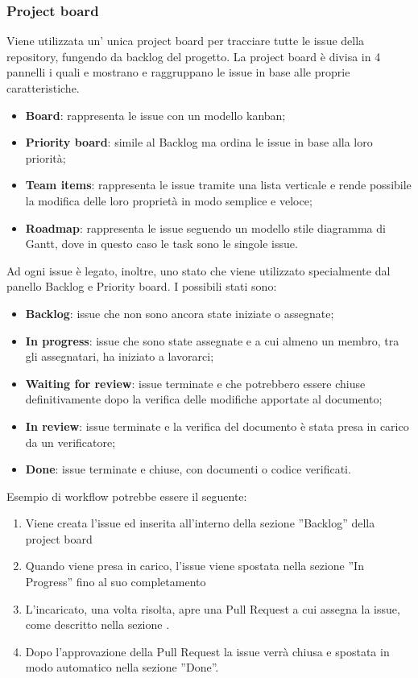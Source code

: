         \subsubsection{Project board}\label{inf:pb}
        Viene utilizzata un' unica project board per tracciare tutte le issue della repository, fungendo da backlog del progetto.
        La project board è divisa in 4 pannelli i quali e mostrano e raggruppano le issue in base alle proprie caratteristiche.
        \begin{itemize}
            \item \textbf{Board}: rappresenta le issue con un modello kanban;
            \item \textbf{Priority board}: simile al Backlog ma ordina le issue in base alla loro priorità;
            \item \textbf{Team items}: rappresenta le issue tramite una lista verticale e rende possibile la modifica delle loro proprietà in modo semplice e veloce;
            \item \textbf{Roadmap}: rappresenta le issue seguendo un modello stile diagramma di Gantt, dove in questo caso le task sono le singole issue.
        \end{itemize}
        Ad ogni issue è legato, inoltre, uno stato che viene utilizzato specialmente dal panello Backlog e Priority board. 
        I possibili stati sono:
        \begin{itemize}
            \item \textbf{Backlog}: issue che non sono ancora state iniziate o assegnate;
            \item \textbf{In progress}: issue che sono state assegnate e a cui almeno un membro, tra gli assegnatari, ha iniziato a lavorarci;
            \item \textbf{Waiting for review}: issue terminate e che potrebbero essere chiuse definitivamente dopo la verifica delle modifiche apportate al documento;
            \item \textbf{In review}: issue terminate e la verifica del documento è stata presa in carico da un verificatore;
            \item \textbf{Done}: issue terminate e chiuse, con documenti o codice verificati.
        \end{itemize}
        Esempio di workflow potrebbe essere il seguente:
        \begin{enumerate}
            \item Viene creata l'issue ed inserita all'interno della sezione ”Backlog” della project board
            \item Quando viene presa in carico, l'issue viene spostata nella sezione ”In Progress” fino al suo completamento
            \item L'incaricato, una volta risolta, apre una Pull Request a cui assegna la issue, come descritto nella sezione .
            \item Dopo l'approvazione della Pull Request la issue verrà chiusa e spostata in modo automatico nella sezione ”Done”.
        \end{enumerate}


